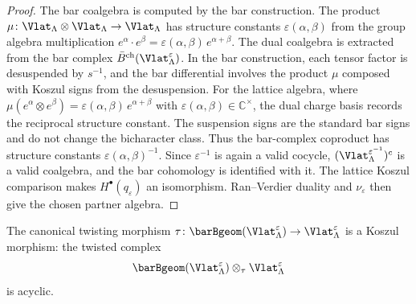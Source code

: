 \begin{proof}
The bar coalgebra is computed by the bar construction. The
product $\mu \colon \Vlat_\Lambda \otimes \Vlat_\Lambda \to \Vlat_\Lambda$
has structure constants $\varepsilon(\alpha,\beta)$ from the group
algebra multiplication $e^\alpha \cdot e^\beta =
\varepsilon(\alpha,\beta)\,e^{\alpha+\beta}$.
The dual coalgebra is extracted from the bar complex
$\bar{B}^{\mathrm{ch}}(\Vlat_\Lambda^\varepsilon)$. In the bar construction,
each tensor factor is desuspended by $s^{-1}$, and the bar differential
involves the product $\mu$ composed with Koszul signs from the
desuspension. For the lattice algebra, where $\mu(e^\alpha \otimes
e^\beta) = \varepsilon(\alpha,\beta)\,e^{\alpha+\beta}$ with
$\varepsilon(\alpha,\beta)\in\mathbb C^\times$, the dual charge basis
records the reciprocal structure constant. The suspension signs are the
standard bar signs and do not change the bicharacter class. Thus the
bar-complex coproduct has structure constants
$\varepsilon(\alpha,\beta)^{-1}$.
Since $\varepsilon^{-1}$ is again a valid cocycle,
$(\Vlat_\Lambda^{\varepsilon^{-1}})^c$ is a valid coalgebra, and the
bar cohomology is identified with it.  The lattice Koszul comparison
makes $H^\bullet(q_\varepsilon)$ an isomorphism.  Ran--Verdier
duality and $\nu_\varepsilon$ then give the chosen partner algebra.
\end{proof}

\begin{theorem}
\label{thm:lattice:koszul-morphism}
The canonical twisting morphism
$\tau \colon \barBgeom(\Vlat_\Lambda^\varepsilon) \to
\Vlat_\Lambda^\varepsilon$
is a Koszul morphism: the twisted complex
\[
\barBgeom(\Vlat_\Lambda^\varepsilon)
\otimes_\tau \Vlat_\Lambda^\varepsilon
\]
is acyclic.
\end{theorem}

